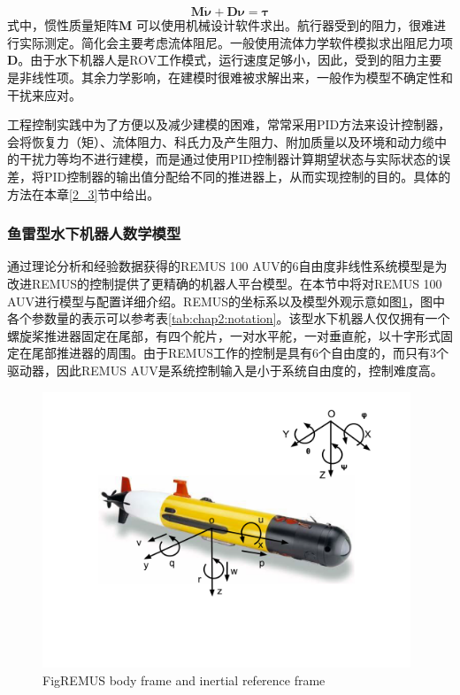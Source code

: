 \begin{equation}
\label{eq:5}
\bm{M} \bm{\dot \nu} + \bm{D} \bm{\nu} =  \bm {\tau }
\end{equation}
式中，惯性质量矩阵$\bm{M}$ 可以使用机械设计软件求出。航行器受到的阻力，很难进行实际测定。简化会主要考虑流体阻尼。一般使用流体力学软件模拟求出阻尼力项$\bm{D}$。由于水下机器人是ROV工作模式，运行速度足够小，因此，受到的阻力主要是非线性项。其余力学影响，在建模时很难被求解出来，一般作为模型不确定性和干扰来应对。

工程控制实践中为了方便以及减少建模的困难，常常采用PID方法来设计控制器，会将恢复力（矩）、流体阻力、科氏力及产生阻力、附加质量以及环境和动力缆中的干扰力等均不进行建模，而是通过使用PID控制器计算期望状态与实际状态的误差，将PID控制器的输出值分配给不同的推进器上，从而实现控制的目的。具体的方法在本章\ref{2_3}节中给出。


\subsubsection{鱼雷型水下机器人数学模型  }

通过理论分析和经验数据获得的REMUS 100 AUV的6自由度非线性系统模型是为改进REMUS的控制提供了更精确的机器人平台模型。在本节中将对REMUS 100 AUV进行模型与配置详细介绍。REMUS的坐标系以及模型外观示意如图\ref{fig:chap2:F6}，图中各个参数量的表示可以参考表\ref{tab:chap2:notation}。该型水下机器人仅仅拥有一个螺旋桨推进器固定在尾部，有四个舵片，一对水平舵，一对垂直舵，以十字形式固定在尾部推进器的周围。由于REMUS工作的控制是具有6个自由度的，而只有3个驱动器，因此REMUS AUV是系统控制输入是小于系统自由度的，控制难度高。

 \begin{figure}[!htp]
 \centering
 \includegraphics[width=11cm]{figure/chap2/REMUS_paper-300ppi.png}
 \label{fig:chap2:F6}
  {Fig}{REMUS body frame and inertial reference frame\cite{wu2016parametric}}
 \end{figure}


